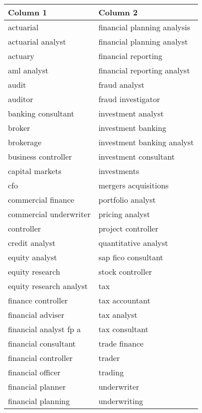 
\centering
\begin{tabular}{p{7cm}p{7cm}}
\toprule
Column 1 & Column 2 \\
\midrule
actuarial & financial planning analysis \\
actuarial analyst & financial planning analyst \\
actuary & financial reporting \\
aml analyst & financial reporting analyst \\
audit & fraud analyst \\
auditor & fraud investigator \\
banking consultant & investment analyst \\
broker & investment banking \\
brokerage & investment banking analyst \\
business controller & investment consultant \\
capital markets & investments \\
cfo & mergers acquisitions \\
commercial finance & portfolio analyst \\
commercial underwriter & pricing analyst \\
controller & project controller \\
credit analyst & quantitative analyst \\
equity analyst & sap fico consultant \\
equity research & stock controller \\
equity research analyst & tax \\
finance controller & tax accountant \\
financial adviser & tax analyst \\
financial analyst fp a & tax consultant \\
financial consultant & trade finance \\
financial controller & trader \\
financial officer & trading \\
financial planner & underwriter \\
financial planning & underwriting \\

\bottomrule
\end{tabular}
